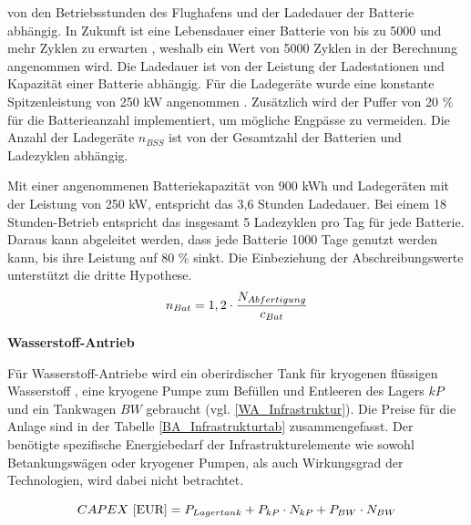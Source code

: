 von den Betriebsstunden des Flughafens und der Ladedauer der Batterie abhängig. 
In Zukunft ist eine Lebensdauer einer Batterie von bis zu 5000 und mehr Zyklen zu erwarten \cite{reimers2018introduction}, 
weshalb ein Wert von 5000 Zyklen in der Berechnung angenommen wird.
Die Ladedauer ist von der Leistung der Ladestationen und Kapazität einer Batterie abhängig.
Für die Ladegeräte wurde eine konstante Spitzenleistung von 250 kW angenommen \cite{salucci2020optimal}. 
Zusätzlich wird der Puffer von 20 \% für die Batterieanzahl implementiert, um mögliche Engpässe zu vermeiden. 
Die Anzahl der Ladegeräte $n_{BSS}$ ist von der Gesamtzahl der Batterien und Ladezyklen abhängig.

Mit einer angenommenen Batteriekapazität von 900 kWh und Ladegeräten 
mit der Leistung von 250 kW, entspricht das 3,6 Stunden Ladedauer.
Bei einem 18 Stunden-Betrieb entspricht das insgesamt 5 Ladezyklen pro Tag für jede Batterie. 
Daraus kann abgeleitet werden, dass jede Batterie 1000 Tage genutzt werden kann,
bis ihre Leistung auf 80 \% sinkt.
Die Einbeziehung der Abschreibungswerte unterstützt die dritte Hypothese.
%
\begin{equation}
  {n_{Bat}} = {1,2} \cdot \frac{N_{Abfertigung}}{c_{Bat}}\\
  \label{BatAnzahl}
\end{equation}

\textbf{Wasserstoff-Antrieb}
%

Für Wasserstoff-Antriebe wird ein oberirdischer Tank für kryogenen flüssigen Wasserstoff , 
eine kryogene Pumpe zum Befüllen und Entleeren des Lagers ${kP}$ 
und ein Tankwagen ${BW}$ gebraucht (vgl. \eqref{WA_Infrastruktur}). 
Die Preise für die Anlage sind in der Tabelle \ref{BA_Infrastrukturtab} zusammengefasst. 
%
Der benötigte spezifische Energiebedarf der Infrastrukturelemente wie sowohl Betankungswägen 
oder kryogener Pumpen, als auch Wirkungsgrad der Technologien, wird dabei nicht betrachtet.

\begin{equation}
   {CAPEX ~[\text{EUR}]} = {P_{Lagertank}} + P_{kP} \cdot N_{kP} + P_{BW} \cdot N_{BW}  \\
   \label{WA_Infrastruktur}
\end{equation}

